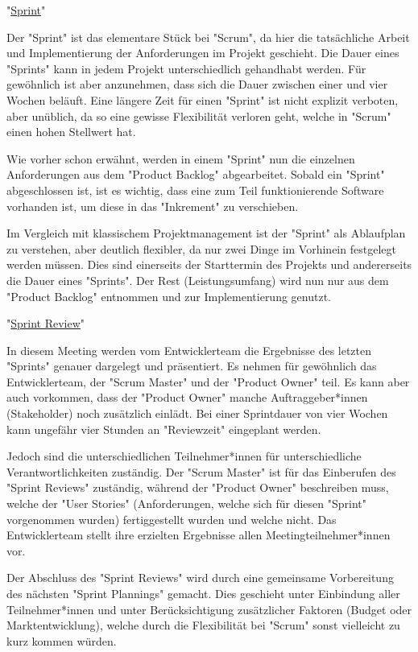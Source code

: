 "\underline{Sprint}"

Der "Sprint" ist das elementare Stück bei "Scrum", da hier die tatsächliche Arbeit und Implementierung der Anforderungen im Projekt geschieht. Die Dauer eines "Sprints" kann in jedem Projekt unterschiedlich gehandhabt werden. Für gewöhnlich ist aber anzunehmen, dass sich die Dauer zwischen einer und vier Wochen beläuft. Eine längere Zeit für einen "Sprint" ist nicht explizit verboten, aber unüblich, da so eine gewisse Flexibilität verloren geht, welche in "Scrum" einen hohen Stellwert hat. \cite{Sprint}

Wie vorher schon erwähnt, werden in einem "Sprint" nun die einzelnen Anforderungen aus dem "Product Backlog" abgearbeitet. Sobald ein "Sprint" abgeschlossen ist, ist es wichtig, dass eine zum Teil funktionierende Software vorhanden ist, um diese in das "Inkrement" zu verschieben. \cite{Sprint}

Im Vergleich mit klassischem Projektmanagement ist der "Sprint" als Ablaufplan zu verstehen, aber deutlich flexibler, da nur zwei Dinge im Vorhinein festgelegt werden müssen. Dies sind einerseits der Starttermin des Projekts und andererseits die Dauer eines "Sprints". Der Rest (Leistungsumfang) wird nun nur aus dem "Product Backlog" entnommen und zur Implementierung genutzt. \cite{Sprint}

"\underline{Sprint Review}"

In diesem Meeting werden vom Entwicklerteam die Ergebnisse des letzten "Sprints" genauer dargelegt und präsentiert. Es nehmen für gewöhnlich das Entwicklerteam, der "Scrum Master" und der "Product Owner" teil. Es kann aber auch vorkommen, dass der "Product Owner" manche Auftraggeber*innen (Stakeholder) noch zusätzlich einlädt. Bei einer Sprintdauer von vier Wochen kann ungefähr vier Stunden an "Reviewzeit" eingeplant werden. \cite{SprintReview}

Jedoch sind die unterschiedlichen Teilnehmer*innen für unterschiedliche Verantwortlichkeiten zuständig. Der "Scrum Master" ist für das Einberufen des "Sprint Reviews" zuständig, während der "Product Owner" beschreiben muss, welche der "User Stories" (Anforderungen, welche sich für diesen "Sprint" vorgenommen wurden) fertiggestellt wurden und welche nicht. Das Entwicklerteam stellt ihre erzielten Ergebnisse allen Meetingteilnehmer*innen vor. \cite{SprintReview}

Der Abschluss des "Sprint Reviews" wird durch eine gemeinsame Vorbereitung des nächsten "Sprint Plannings" gemacht. Dies geschieht unter Einbindung aller Teilnehmer*innen und unter Berücksichtigung zusätzlicher Faktoren (Budget oder Marktentwicklung), welche durch die Flexibilität bei "Scrum" sonst vielleicht zu kurz kommen würden. \cite{SprintReview}

